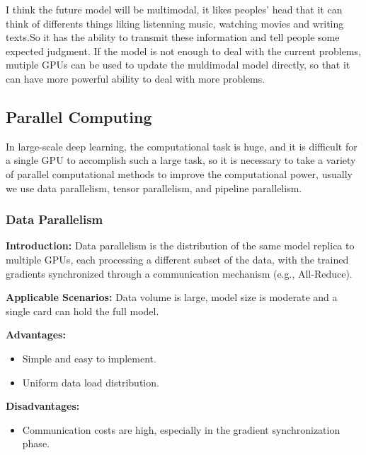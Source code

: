 \documentclass{article}
\begin{document}
I think the future model will be multimodal, it likes peoples' head that it can think of differents things liking listenning music, watching movies and writing texts.So it has the ability to transmit these information and tell people some expected judgment. If the model is not enough to deal with the current problems, mutiple GPUs can be used to update the muldimodal model directly, so that it can have more powerful ability to deal with more problems.


\subsection{Parallel Computing}
\hspace{2em}

In large-scale deep learning, the computational task is huge, and it is difficult for a single GPU to accomplish such a large task, so it is necessary to take a variety of parallel computational methods to improve the computational power, usually we use data parallelism, tensor parallelism, and pipeline parallelism.
\subsubsection{Data Parallelism}
\hspace{2em}

\textbf{Introduction:} Data parallelism is the distribution of the same model replica to multiple GPUs, each processing a different subset of the data, with the trained gradients synchronized through a communication mechanism (e.g., All-Reduce).

\textbf{Applicable Scenarios:} Data volume is large, model size is moderate and a single card can hold the full model.

\textbf{Advantages:} 
    \begin{itemize}
       
            \item Simple and easy to implement.
        \end{itemize}
    
    \begin{itemize}
        
            \item Uniform data load distribution.
        \end{itemize}

\textbf{Disadvantages:} 
\begin{itemize}
       
            \item Communication costs are high, especially in the gradient synchronization phase.
        \end{itemize}
    
\end{document}
